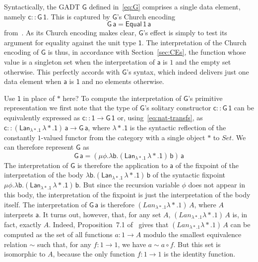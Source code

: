\documentclass[acmsmall,screen,review,anonymous]{acmart}
\theoremstyle{definition}
\newcommand{\set}{\mathsf{Set}}
\begin{document}
\begin{example}\label{ex:g1}
Syntactically, the GADT $\mathsf{G}$ defined in~\eqref{eq:G} comprises
a single data element, namely $\mathsf{c :: G \, 1}$. This is captured
by $\mathsf{G}$'s Church encoding
\[\mathsf{G\,a} = \mathsf{Equal\,1\,a}\]
from~\cite{atk12}. As its Church encoding makes clear, $\mathsf{G}$'s
effect is simply to test its argument for equality against the unit
type $\mathsf{1}$. The interpretation of the Church encoding of
$\mathsf{G}$ is thus, in accordance with Section~\ref{sec:CEs}, the
function whose value is a singleton set when the interpretation of
$\mathsf{a}$ is $1$ and the empty set otherwise. This perfectly
accords with $\mathsf{G}$'s syntax, which indeed delivers just one
data element when $\mathsf{a}$ is $\mathsf{1}$ and no elements
otherwise.

{\color{blue} Use $\mathsf{1}$ in place of $\mathsf{*}$ here?}
To compute the interpretation of $\mathsf{G}$'s primitive
representation we first note that the type of $\mathsf{G}$'s solitary
constructor $\mathsf{c :: G\,1}$ can be equivalently expressed as
$\mathsf{c :: 1 \to G\,1}$ or, using~\eqref{eq:nat-transfs}, as
$\mathsf{c :: (Lan_{\lambda *. 1}\,\lambda *. 1)\,a \to G\, a}$, where
$\mathsf{\lambda *. 1}$ is the syntactic reflection of the constantly
$1$-valued functor from the category with a single object $*$ to
$\mathit{Set}$. We can therefore represent $\mathsf{G}$ as
\[\mathsf{G\,a} = \mathsf{(\mu \phi. \lambda b.
 (Lan_{\lambda *. 1} \,\lambda *.  1)\,b)\,a}\] The interpretation of
$\mathsf{G}$ is therefore the application to $\mathsf{a}$ of the
fixpoint of the interpretation of the body $\mathsf{\lambda
  b. (Lan_{\lambda *. 1} \,\lambda *. 1)\,b}$ of the syntactic
fixpoint $\mathsf{\mu \phi. \lambda b.  (Lan_{\lambda *. 1} \,\lambda
  *.  1)\,b}$. But since the recursion variable $\mathsf{\phi}$ does
not appear in this body, the interpretation of the fixpoint is just
the interpretation of the body itself.  The interpretation of
$\mathsf{G\,a}$ is therefore $(\mathit{Lan}_{\lambda *. 1} \lambda
*. 1)\, A$, where $A$ interprets $\mathsf{a}$.
It turns out, however, that, for any set $A$, $(\mathit{Lan}_{\lambda
  *. 1} \lambda *. 1)\,A$ is, in fact, exactly $A$. Indeed,
Proposition~7.1 of~\cite{blw03} gives that $(\mathit{Lan}_{\lambda
  *. 1} \lambda *. 1)\,A$ can be computed as the set of all functions
$a : 1 \to A$ modulo the smallest equivalence relation $\sim$ such
that, for any $f : 1 \to 1$, we have $a \sim a \circ f$.  But this set
is isomorphic to $A$, because the only function $f : 1 \to 1$ is the
identity function.



\end{example}
\end{document}
